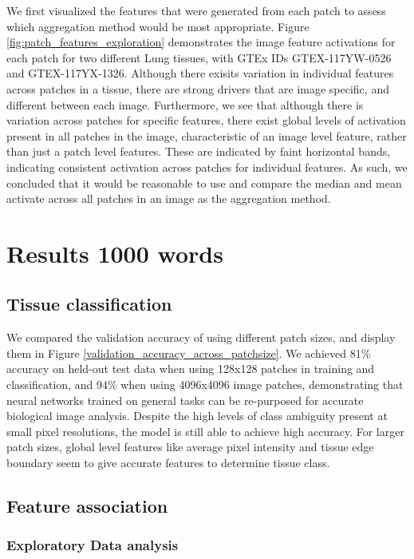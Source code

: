\documentclass[graybox]{svmult}
\begin{document}
We first visualized the features that were generated from each patch to assess which aggregation method would be most appropriate. Figure \ref{fig:patch_features_exploration} demonstrates the image feature activations for each patch for two different Lung tissues, with GTEx IDs GTEX-117YW-0526 and GTEX-117YX-1326. Although there exisits variation in individual features across patches in a tissue, there are strong drivers that are image specific, and different between each image. Furthermore, we see that although there is variation across patches for specific features, there exist global levels of activation present in all patches in the image, characteristic of an image level feature, rather than just a patch level features. These are indicated by faint horizontal bands, indicating consistent activation across patches for individual features. As such, we concluded that it would be reasonable to use and compare the median and mean activate across all patches in an image as the aggregation method.


\section{Results 1000 words}

\subsection{Tissue classification}

We compared the validation accuracy of using different patch sizes, and display them in Figure \ref{validation_accuracy_across_patchsize}. We achieved 81\% accuracy on held-out test data when using 128x128 patches in training and classification, and 94\% when using 4096x4096 image patches, demonstrating that neural networks trained on general tasks can be re-purposed for accurate biological image analysis. Despite the high levels of class ambiguity present at small pixel resolutions, the model is still able to achieve high accuracy. For larger patch sizes, global level features like average pixel intensity and tissue edge boundary seem to give accurate features to determine tissue class.

\subsection{Feature association}

\subsubsection{Exploratory Data analysis}
\end{document}
